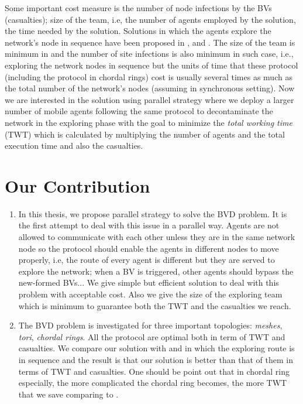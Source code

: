Some important cost measure is the number of node infections by the BVs (casualties); size of the team, i.e, the number of agents employed by the solution, the time needed by the solution. Solutions in which the agents explore the network's node in sequence have been proposed in \cite{Cai}, \cite{Alotaibi} and \cite{ Cai1}. The size of the team is minimum in \cite{Cai,Cai1} and the number of site infections is also minimum in such case, i.e., exploring the network nodes in sequence but the units of time that these protocol (including the protocol in chordal rings) cost is usually several times as much as the total number of the network's nodes (assuming in synchronous setting). Now we are interested in the solution using parallel strategy where we deploy a larger number of mobile agents following the same protocol to decontaminate the network in the exploring phase with the goal to minimize the {\em total working time} (TWT) which is calculated by multiplying the number of agents and the total execution time and also the casualties.


\section{Our Contribution} 


\begin{enumerate}
\item In this thesis, we propose parallel strategy to solve the BVD problem. It is the first attempt to deal with this issue in a parallel way. Agents are not allowed to communicate with each other unless they are in the same network node so the protocol should enable the agents in different nodes to move properly, i.e, the route of every agent is different but they are served to explore the network; when a BV is triggered, other agents should bypass the new-formed BVs... We give simple but efficient solution to deal with this problem with acceptable cost. Also we give the size of the exploring team which is minimum to guarantee both the TWT and the  casualties we reach.
\item The BVD problem is investigated for three important topologies: {\em meshes}, {\em tori}, {\em chordal rings}. All the protocol are optimal both in term of TWT and casualties. We compare our solution with \cite{Cai} and \cite{Alotaibi} in which the exploring route is in sequence and the result is that our solution is better than that of them in terms of TWT and casualties. One should be point out that in chordal ring especially, the more complicated the chordal ring becomes, the more TWT that we save comparing to \cite{Alotaibi}.
\end{enumerate}

